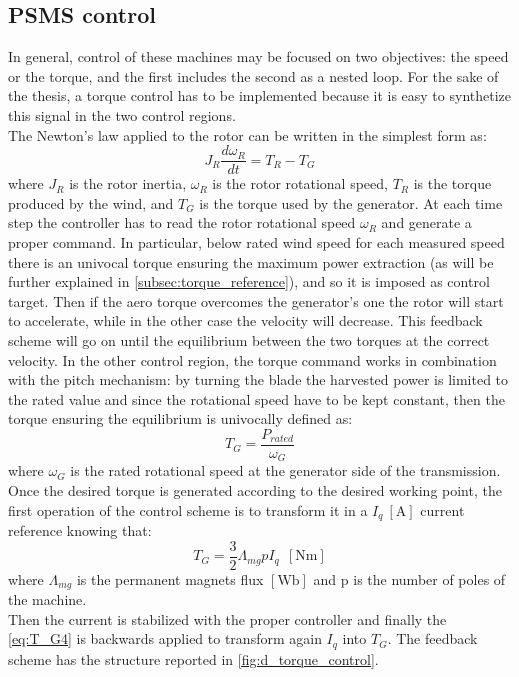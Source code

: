 \subsection{PSMS control}\label{subsec:PMSM_control}
In general, control of these machines may be focused on two objectives: the speed or the torque, and the first includes the second as a nested loop. For the sake of the thesis, a torque control has to be implemented because it is easy to synthetize this signal in the two control regions. \\
The Newton's law applied to the rotor can be written in the simplest form as:
\begin{equation}
    J_R\frac{d\omega_R}{dt}=T_R-T_G
    \label{eq:simple_dynamic}
\end{equation}
where $J_R$ is the rotor inertia, $\omega_R$ is the rotor rotational speed, $T_R$ is the torque produced by the wind, and $T_G$ is the torque used by the generator. At each time step the controller has to read the rotor rotational speed $\omega_R$ and generate a proper command. In particular, below rated wind speed for each measured speed there is an univocal torque ensuring the maximum power extraction (as will be further explained in \autoref{subsec:torque_reference}), and so it is imposed as control target. Then if the aero torque overcomes the generator's one the rotor will start to accelerate, while in the other case the velocity will decrease. This feedback scheme will go on until the equilibrium between the two torques at the correct velocity. In the other control region, the torque command works in combination with the pitch mechanism: by turning the blade the harvested power is limited to the rated value and since the rotational speed have to be kept constant, then the torque ensuring the equilibrium is univocally defined as: 
\begin{equation}
    T_G=\frac{P_{rated}}{\omega_G}
    \label{eq:simple_torque}
\end{equation}
where $\omega_G$ is the rated rotational speed at the generator side of the transmission. \\

Once the desired torque is generated according to the desired working point, the first operation of the control scheme is to transform it in a $I_q \ \left[\si{\ampere}\right]$ current reference knowing that:
\begin{equation}
    T_G = \frac{3}{2}\Lambda_{mg} p I_q \ \ \left[\si{\newton\meter}\right]
    \label{eq:T_G4}
\end{equation}
where $\Lambda_{mg}$ is the permanent magnets flux $\left[\si{\weber}\right]$ and p is the number of poles of the machine.\\
Then the current is stabilized with the proper controller and finally the \autoref{eq:T_G4} is backwards applied to transform again $I_q$ into $T_G$. The feedback scheme has the structure reported in \autoref{fig:d_torque_control}.

